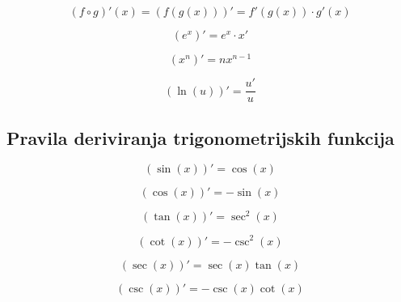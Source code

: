 \begin{propositionbox}
    $$
        (f\circ g)'(x) = (f(g(x)))' = f'(g(x)) \cdot g'(x)
    $$
\end{propositionbox}

\begin{propositionbox}
    $$
        (e^x)' = e^x \cdot x'
    $$
\end{propositionbox}

\begin{propositionbox}
    $$
        (x^{n})' = nx^{n-1}
    $$
\end{propositionbox}

\begin{propositionbox}
    $$
        (\ln(u))' = \frac{u'}{u}
    $$
\end{propositionbox}

\subsection{Pravila deriviranja trigonometrijskih funkcija}

\begin{propositionbox}
    $$
        (\sin(x))' = \cos(x)
    $$
\end{propositionbox}

\begin{propositionbox}
    $$
        (\cos(x))' = -\sin(x)
    $$
\end{propositionbox}

\begin{propositionbox}
    $$
        (\tan(x))' = \sec^2(x)
    $$
\end{propositionbox}

\begin{propositionbox}
    $$
        (\cot(x))' = -\csc^2(x)
    $$
\end{propositionbox}

\begin{propositionbox}
    $$
        (\sec(x))' = \sec(x) \tan(x)
    $$
\end{propositionbox}

\begin{propositionbox}
    $$
        (\csc(x))' = -\csc(x) \cot(x)
    $$
\end{propositionbox}

